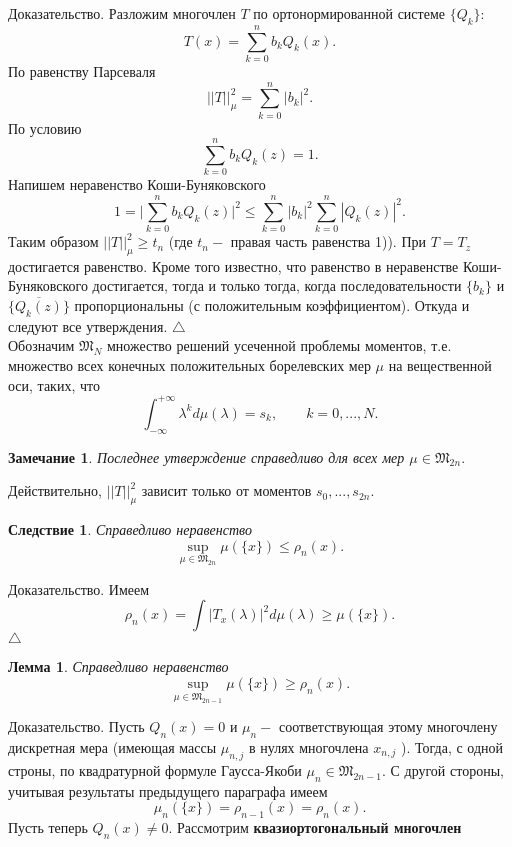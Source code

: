 \documentclass[12 pt, a4 paper]{article}
\theoremstyle{plain}   \newtheorem{Pro}{Задача}
\newtheorem{Rem}{Замечание}
\newtheorem{Cor}{Следствие}
\newtheorem{Lem}{Лемма}
\begin{document}
{\Large Доказательство.}
Разложим многочлен
$ T $
по ортонормированной системе
$ \{ Q_k \} : $
$$
  T(x)=\sum _{k=0}^n b_k Q_k (x) .
$$
По равенству Парсеваля
$$
  ||T||_{\mu}^2 =\sum _{k=0}^n |b_k |^2 .
$$
По условию
$$
  \sum _{k=0}^n b_k Q_k (z) =1 .
$$
Напишем неравенство Коши-Буняковского
$$
  1= \Biggl | \sum _{k=0}^n b_k Q_k (z) \Biggr | ^2
  \leq \sum _{k=0}^n |b_k |^2 \sum _{k=0}^n |Q_k (z)|^2 .
$$
Таким образом
$ ||T||_{\mu}^2 \geq t_n $
(где
$ t_n - $
правая часть равенства 1)). При
$ T=T_z $
достигается равенство. Кроме того известно, что равенство
в неравенстве Коши-Буняковского достигается, тогда и только тогда,
когда  последовательности
$ \{ b_k \} $
и
$ \{ \overline {Q_k (z) } \} $
пропорциональны (с положительным коэффициентом).
Откуда и следуют все утверждения.
$ \triangle $
\\
Обозначим
$ \mathfrak{M}_N $
множество решений усеченной проблемы моментов, т.е. множество
всех конечных положительных борелевских мер
$ \mu $
на вещественной оси, таких, что
$$
  \int _{-\infty}^{+\infty} \lambda ^k d\mu (\lambda )=
  s_k , \qquad k=0,...,N .
$$
\begin{Rem}
Последнее утверждение справедливо для всех мер
$ \mu \in \mathfrak{M}_{2n} . $
\end{Rem}
Действительно,
$ ||T||_{\mu}^2 $
зависит только от моментов
$ s_0 ,..., s_{2n} . $
\begin{Cor}
Справедливо неравенство
$$
  \sup _{\mu \in \mathfrak{M}_{2n}} \mu (\{ x \} )
  \leq \rho _n (x) .
$$
\end{Cor}
{\Large Доказательство.}
Имеем
$$
  \rho _n (x)=\int |T_x (\lambda )|^2d\mu (\lambda )
  \geq \mu ( \{ x \} ).
$$
$ \triangle $    						   						
\begin{Lem}
Справедливо неравенство
$$
  \sup _{\mu \in \mathfrak{M}_{2n-1}}
  \mu ( \{ x \} ) \geq \rho _n (x).
$$
\end{Lem}
{\Large Доказательство.}
Пусть
$ Q_n (x)=0 $
и
$ \mu _n - $
соответствующая этому многочлену дискретная мера
(имеющая массы
$ \mu _{n,j} $
в нулях многочлена
$ x_{n,j} $
). Тогда, с одной строны, по квадратурной формуле Гаусса-Якоби
$ \mu_n \in \mathfrak{M}_{2n-1} . $
С другой стороны, учитывая результаты предыдущего параграфа
имеем
$$
  \mu _n ( \{ x \} ) = \rho _{n-1}(x) =\rho _n (x) .
$$
Пусть теперь
$ Q_n (x) \not = 0. $
Рассмотрим
{\bfseries квазиортогональный многочлен}
\end{document}
